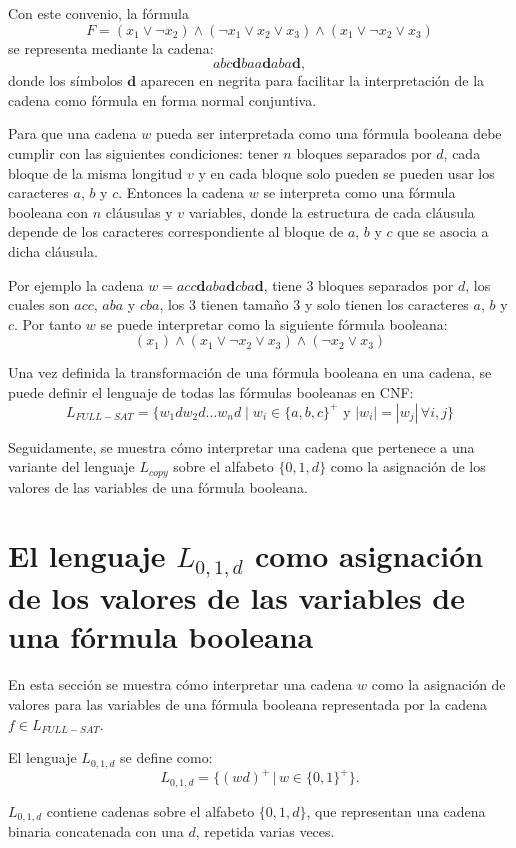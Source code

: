 \documentclass[12pt]{article}
\begin{document}
Con este convenio, la fórmula
$$ F=(x_1 \vee \neg x_2) \wedge (\neg x_1 \vee x_2 \vee x_3) \wedge (x_1 \vee \neg x_2 \vee x_3)$$
se representa mediante la cadena:
$$abc\mathbf{d}baa\mathbf{d}aba\mathbf{d},$$
donde los símbolos $\mathbf{d}$ aparecen en negrita para facilitar la interpretación de la cadena como fórmula 
en forma normal conjuntiva.

Para que una cadena $w$ pueda ser interpretada como una fórmula booleana debe cumplir con las siguientes condiciones:
tener $n$ bloques separados por $d$, cada bloque de la misma longitud $v$ y en cada bloque solo pueden se pueden usar los caracteres
$a$, $b$ y $c$. Entonces la cadena $w$ se interpreta como una fórmula booleana con $n$ cláusulas y $v$ variables, donde la estructura
de cada cláusula depende de los caracteres correspondiente al bloque de $a$, $b$ y $c$ que se asocia a dicha cláusula.

Por ejemplo la cadena $w=acc\mathbf{d}aba\mathbf{d}cba\mathbf{d}$, tiene 3 bloques separados por $d$, los cuales son $acc$, $aba$ y $cba$, los 3 tienen tamaño 3 y solo tienen los caracteres $a$, $b$ y $c$.
Por tanto  $w$ se puede interpretar como la siguiente fórmula booleana:
$$(x_1)\wedge(x_1\vee \neg x_2 \vee x_3) \wedge (\neg x_2\vee x_3)$$

Una vez definida la transformación de una fórmula booleana en una cadena, se puede definir el lenguaje de todas las fórmulas booleanas en CNF:
\[
    L_{FULL-SAT} = \{ w_1dw_2d\dots w_nd \mid w_i \in \{a, b,c\}^+ \text{ y } |w_i| = |w_j| \, \forall i, j \}
\]

Seguidamente, se muestra cómo interpretar una cadena que pertenece a una variante 
del lenguaje $L_{copy}$ sobre el alfabeto $\{0,1,d\}$ como la asignación de los valores de las variables de una fórmula booleana.

\section{El lenguaje $L_{0,1,d}$ como asignación de los valores de las variables de una fórmula booleana}
\label{sec:intsat}

En esta sección se muestra cómo interpretar una cadena $w$ como la asignación de valores para las variables 
de una fórmula booleana representada por la cadena $f\in L_{FULL-SAT}$.

El lenguaje $L_{0,1,d}$ se define como:
$$L_{0,1,d}=\{(wd)^+\,|\,w\in\{0,1\}^+\}.$$

$L_{0,1,d}$ contiene cadenas sobre el alfabeto $\{0,1,d\}$, que representan una cadena binaria concatenada con una $d$,
repetida varias veces.
\end{document}
